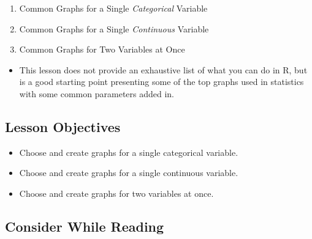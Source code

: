 \documentclass[
  letterpaper,
  DIV=11,
  numbers=noendperiod]{scrreprt}
\providecommand{\tightlist}{%
  \setlength{\itemsep}{0pt}\setlength{\parskip}{0pt}}\usepackage{longtable,booktabs,array}
\begin{document}
\begin{enumerate}
\def\labelenumi{\arabic{enumi}.}
\tightlist
\item
  Common Graphs for a Single \emph{Categorical} Variable
\item
  Common Graphs for a Single \emph{Continuous} Variable
\item
  Common Graphs for Two Variables at Once
\end{enumerate}

\begin{itemize}
\tightlist
\item
  This lesson does not provide an exhaustive list of what you can do in
  R, but is a good starting point presenting some of the top graphs used
  in statistics with some common parameters added in.
\end{itemize}

\subsection{Lesson Objectives}\label{lesson-objectives-2}

\begin{itemize}
\tightlist
\item
  Choose and create graphs for a single categorical variable.
\item
  Choose and create graphs for a single continuous variable.
\item
  Choose and create graphs for two variables at once.
\end{itemize}

\subsection{Consider While Reading}\label{consider-while-reading-2}
\end{document}
